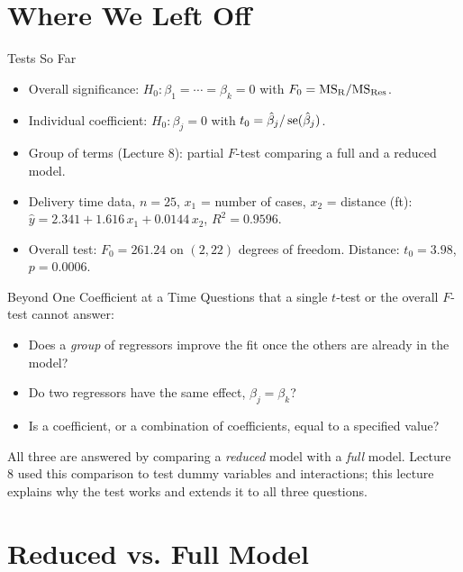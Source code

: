 \section{Where We Left Off}


\begin{frame}{Tests So Far}
    \begin{itemize}
        \item Overall significance: $H_0:\beta_1=\cdots=\beta_k=0$ with $F_0=\mathrm{MS}_{\mathrm{R}}/\mathrm{MS}_{\mathrm{Res}}$.
        \item Individual coefficient: $H_0:\beta_j=0$ with $t_0=\hat\beta_j/\operatorname{se}(\hat\beta_j)$.
        \item Group of terms (Lecture 8): partial $F$-test comparing a full and a reduced model.
        \item Delivery time data, $n=25$, $x_1$ = number of cases, $x_2$ = distance (ft): $\hat y = 2.341 + 1.616\,x_1 + 0.0144\,x_2$, $R^2 = 0.9596$.
        \item Overall test: $F_0=261.24$ on $(2,22)$ degrees of freedom. Distance: $t_0=3.98$, $p=0.0006$.
    \end{itemize}
\end{frame}


\begin{frame}{Beyond One Coefficient at a Time}
    Questions that a single $t$-test or the overall $F$-test cannot answer:
    \svspace{0.5em}
    \begin{itemize}
        \item Does a \emph{group} of regressors improve the fit once the others are already in the model?
        \item Do two regressors have the same effect, $\beta_j=\beta_k$?
        \item Is a coefficient, or a combination of coefficients, equal to a specified value?
    \end{itemize}
    \svspace{0.5em}
    All three are answered by comparing a \emph{reduced} model with a \emph{full} model. Lecture 8 used this comparison to test dummy variables and interactions; this lecture explains why the test works and extends it to all three questions.
\end{frame}


\section{Reduced vs. Full Model}


